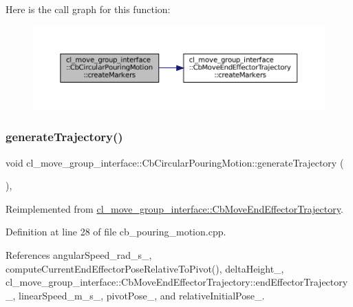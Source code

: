 Here is the call graph for this function\+:
\nopagebreak
\begin{figure}[H]
\begin{center}
\leavevmode
\includegraphics[width=350pt]{classcl__move__group__interface_1_1CbCircularPouringMotion_a26d603b1d9bdbf5b71da6c1c4af2c322_cgraph}
\end{center}
\end{figure}
\mbox{\label{classcl__move__group__interface_1_1CbCircularPouringMotion_a9150bb3731082aad3af2d7d6e067a344}} 
\subsubsection{\texorpdfstring{generate\+Trajectory()}{generateTrajectory()}}
{\footnotesize\ttfamily void cl\+\_\+move\+\_\+group\+\_\+interface\+::\+Cb\+Circular\+Pouring\+Motion\+::generate\+Trajectory (\begin{DoxyParamCaption}{ }\end{DoxyParamCaption})\hspace{0.3cm}{\ttfamily [override]}, {\ttfamily [virtual]}}



Reimplemented from \hyperlink{classcl__move__group__interface_1_1CbMoveEndEffectorTrajectory_aeae938ab66e18ab7d2fb2427bc83647b}{cl\+\_\+move\+\_\+group\+\_\+interface\+::\+Cb\+Move\+End\+Effector\+Trajectory}.



Definition at line 28 of file cb\+\_\+pouring\+\_\+motion.\+cpp.



References angular\+Speed\+\_\+rad\+\_\+s\+\_\+, compute\+Current\+End\+Effector\+Pose\+Relative\+To\+Pivot(), delta\+Height\+\_\+, cl\+\_\+move\+\_\+group\+\_\+interface\+::\+Cb\+Move\+End\+Effector\+Trajectory\+::end\+Effector\+Trajectory\+\_\+, linear\+Speed\+\_\+m\+\_\+s\+\_\+, pivot\+Pose\+\_\+, and relative\+Initial\+Pose\+\_\+.


